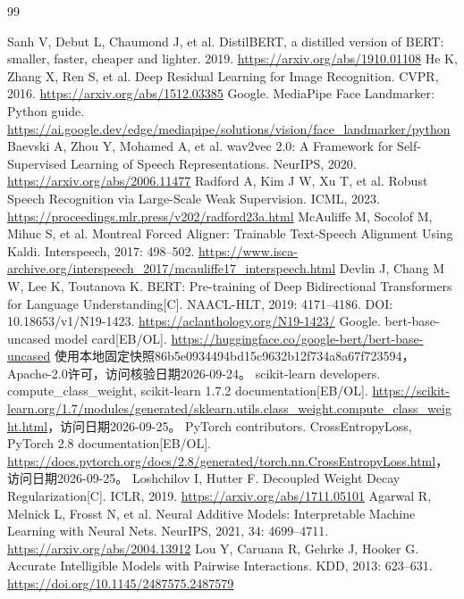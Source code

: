 \begin{thebibliography}{99}
\raggedright
{}
Sanh V, Debut L, Chaumond J, et al. DistilBERT, a distilled version of BERT: smaller, faster, cheaper and lighter. 2019. \url{https://arxiv.org/abs/1910.01108}
He K, Zhang X, Ren S, et al. Deep Residual Learning for Image Recognition. CVPR, 2016. \url{https://arxiv.org/abs/1512.03385}
Google. MediaPipe Face Landmarker: Python guide. \url{https://ai.google.dev/edge/mediapipe/solutions/vision/face_landmarker/python}
Baevski A, Zhou Y, Mohamed A, et al. wav2vec 2.0: A Framework for Self-Supervised Learning of Speech Representations. NeurIPS, 2020. \url{https://arxiv.org/abs/2006.11477}
Radford A, Kim J W, Xu T, et al. Robust Speech Recognition via Large-Scale Weak Supervision. ICML, 2023. \url{https://proceedings.mlr.press/v202/radford23a.html}
McAuliffe M, Socolof M, Mihuc S, et al. Montreal Forced Aligner: Trainable Text-Speech Alignment Using Kaldi. Interspeech, 2017: 498--502. \url{https://www.isca-archive.org/interspeech_2017/mcauliffe17_interspeech.html}
Devlin J, Chang M W, Lee K, Toutanova K. BERT: Pre-training of Deep Bidirectional Transformers for Language Understanding{[}C{]}. NAACL-HLT, 2019: 4171--4186. DOI: 10.18653/v1/N19-1423. \url{https://aclanthology.org/N19-1423/}
Google. bert-base-uncased model card{[}EB/OL{]}. \url{https://huggingface.co/google-bert/bert-base-uncased} 使用本地固定快照86b5e0934494bd15c9632b12f734a8a67f723594，Apache-2.0许可，访问核验日期2026-09-24。
scikit-learn developers. compute\_class\_weight, scikit-learn 1.7.2 documentation{[}EB/OL{]}. \url{https://scikit-learn.org/1.7/modules/generated/sklearn.utils.class_weight.compute_class_weight.html}，访问日期2026-09-25。
PyTorch contributors. CrossEntropyLoss, PyTorch 2.8 documentation{[}EB/OL{]}. \url{https://docs.pytorch.org/docs/2.8/generated/torch.nn.CrossEntropyLoss.html}，访问日期2026-09-25。
Loshchilov I, Hutter F. Decoupled Weight Decay Regularization{[}C{]}. ICLR, 2019. \url{https://arxiv.org/abs/1711.05101}
Agarwal R, Melnick L, Frosst N, et al. Neural Additive Models: Interpretable Machine Learning with Neural Nets. NeurIPS, 2021, 34: 4699--4711. \url{https://arxiv.org/abs/2004.13912}
Lou Y, Caruana R, Gehrke J, Hooker G. Accurate Intelligible Models with Pairwise Interactions. KDD, 2013: 623--631. \url{https://doi.org/10.1145/2487575.2487579}

\end{thebibliography}
